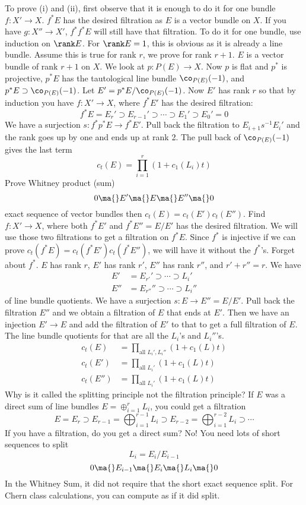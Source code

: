 To prove (i) and (ii), first observe that it is enough to do it for one bundle $f: X' \to X$. $f^*E$ has the desired filtration as $E$ is a vector bundle on $X$. If you have $g: X'' \to X'$, $f^*f^*E$ will still have that filtration. To do it for one bundle, use induction on $\rank E$. For $\rank E=1$, this is obvious as it is already a line bundle. Assume this is true for rank $r$, we prove for rank $r+1$. $E$ is a vector bundle of rank $r+1$ on $X$. We look at $p: P(E) \to X$. Now $p$ is flat and $p^*$ is projective, $p^*E$ has the tautological line bundle $\co_{P(E)}(-1)$, and $p^*E \supset \co_{P(E)}(-1)$. Let $E'=p^*E/\co_{P(E)}(-1)$. Now $E'$ has rank $r$ so that by induction you have $f: X' \to X$, where $f^*E'$ has the desired filtration:
	\[
	f^*E=E_r' \supset E_{r-1}' \supset \cdots \supset E_1' \supset E_0'=0
	\]
We have a surjection $s: f^*p^*E \to f^*E'$. Pull back the filtration to $E_{i+1}s^{-1}E_i'$ and the rank goes up by one and ends up at rank 2. The pull back of $\co_{P(E)}(-1)$ gives the last term
	\[
	c_t(E)=\prod_{i=1}^r (1+c_1(L_i)t)
	\]
Prove Whitney product (sum)
	\[
	0 \ma{} E' \ma{} E \ma{} E'' \ma{} 0
	\]
exact sequence of vector bundles then $c_t(E)=c_t(E') c_t(E'')$. Find $f: X' \to X$, where both $f^*E'$ and $f^*E''= E/E'$ has the desired filtration. We will use those two filtrations to get a filtration on $f^*E$. Since $f^*$ is injective if we can prove $c_t(f^*E)=c_t(f^*E')c_t(f^*E'')$, we will have it without the $f^*$'s. Forget about $f^*$. $E$ has rank $r$, $E'$ has rank $r'$, $E''$ has rank $r''$, and $r'+r''=r$. We have
	\[
	\begin{split}
	E'&= E_{r'}' \supset \cdots \supset L_i' \\
	E''&= E_{r''}'' \supset \cdots \supset L_i''
	\end{split}
	\]
of line bundle quotients. We have a surjection $s: E \to E''=E/E'$. Pull back the filtration $E''$ and we obtain a filtration of $E$ that ends at $E'$. Then we have an injection $E' \to E$ and add the filtration of $E'$ to that to get a full filtration of $E$. The line bundle quotients for that are all the $L_i$'s and $L_i''$'s. 
	\[
	\begin{split}
	c_t(E)&= \prod_{\text{all } L_i', L_i''} (1+c_1(L)t) \\
	c_t(E')&= \prod_{\text{all } L_i'} (1+c_1(L)t) \\
	c_t(E'')&= \prod_{\text{all }L_i'} (1+c_1(L)t)
	\end{split}
	\]
Why is it called the splitting principle not the filtration principle? If $E$ was a direct sum of line bundles $E=\oplus_{i=1}^r L_i$, you could get a filtration
	\[
	E=E_r \supset E_{r-1}=\bigoplus_{i=1}^{r-1} L_i \supset E_{r-2}=\bigoplus_{i=1}^{r-2} L_i \supset \cdots
	\]
If you have a filtration, do you get a direct sum? No! You need lots of short sequences to split
	\[
	L_i= E_i/E_{i-1}
	\]
	\[
	0 \ma{} E_{i-1} \ma{} E_i \ma{} L_i \ma{} 0
	\]
In the Whitney Sum, it did not require that the short exact sequence split. For Chern class calculations, you can compute as if it did split. 


